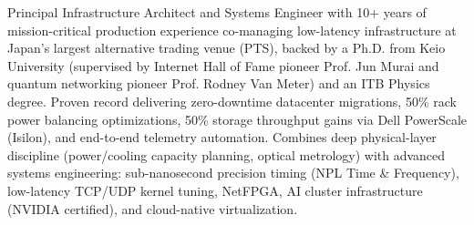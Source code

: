 

\begin{cvparagraph}

Principal Infrastructure Architect and Systems Engineer with 10+ years of mission-critical production experience co-managing low-latency infrastructure at Japan's largest alternative trading venue (PTS), backed by a Ph.D. from Keio University (supervised by Internet Hall of Fame pioneer Prof. Jun Murai and quantum networking pioneer Prof. Rodney Van Meter) and an ITB Physics degree. Proven record delivering zero-downtime datacenter migrations, 50\% rack power balancing optimizations, 50\% storage throughput gains via Dell PowerScale (Isilon), and end-to-end telemetry automation. Combines deep physical-layer discipline (power/cooling capacity planning, optical metrology) with advanced systems engineering: sub-nanosecond precision timing (NPL Time \& Frequency), low-latency TCP/UDP kernel tuning, NetFPGA, AI cluster infrastructure (NVIDIA certified), and cloud-native virtualization.
\end{cvparagraph}
